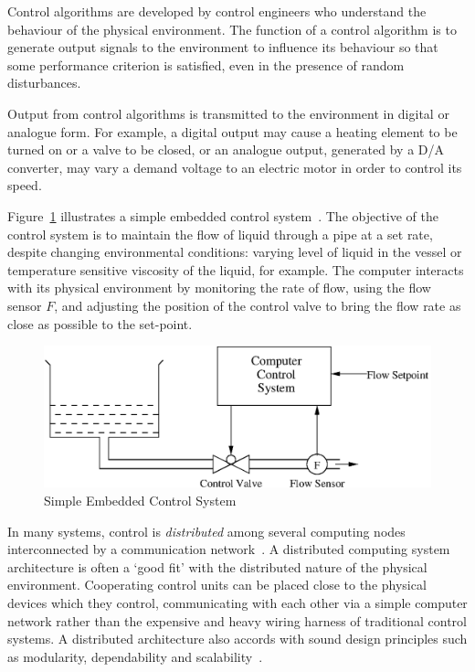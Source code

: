 Control algorithms are developed by control engineers who understand
the behaviour of the physical environment. The function of a control
algorithm is to generate output signals to the environment to influence
its behaviour so that some performance criterion is satisfied, even in
the presence of random disturbances.

Output from control algorithms is transmitted to the environment in
digital or analogue form.  For example, a digital output may cause a
heating element to be turned on or a valve to be closed, or an
analogue output, generated by a D/A converter, may vary a demand
voltage to an electric motor in order to control its speed.

Figure~\ref{fig:introflow} illustrates a simple embedded control
system~\cite{kop:97}. The objective of the control system is to maintain
the flow of liquid through a pipe at a set rate, despite changing
environmental conditions: varying level of liquid in the vessel or
temperature sensitive viscosity of the liquid, for example. The computer
interacts with its physical environment by monitoring the rate of
flow, using the flow sensor $F$, and adjusting the position of the control
valve to bring the flow rate as close as possible to the set-point. 

\begin{figure}
\centering
\includegraphics[width=.7\linewidth]{INTRO/flow.eps}
\caption{Simple Embedded Control System\label{fig:introflow}}
\end{figure}

In many systems, control is \emph{distributed} among several computing
nodes interconnected by a communication network~\cite{tor:98}. A
distributed computing system architecture is often a `good fit' with
the distributed nature of the physical environment. Cooperating
control units can be placed close to the physical devices which they
control, communicating with each other via a simple computer network
rather than the expensive and heavy wiring harness of traditional
control systems.  A distributed architecture also accords with sound
design principles such as modularity, dependability and 
scalability~\cite{kop:97}.

